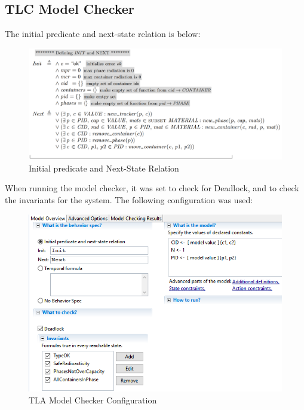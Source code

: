 \newpage

\subsection{TLC Model Checker}

The initial predicate and next-state relation is below:


\begin{figure}[!htb]
\begin{center}
\includegraphics[width=.99\textwidth]{images/init_next.png}
\end{center}
\caption{Initial predicate and Next-State Relation}
\label{fig:init_next}
\end{figure}


\newpage
When running the model checker, it was set to check for Deadlock, and to check the invariants for the system. The following configuration was used:

\begin{figure}[!htb]
\begin{center}
\includegraphics[width=.99\textwidth]{images/model_config.png}
\end{center}
\caption{TLA Model Checker Configuration}
\label{fig:model_config}
\end{figure}

